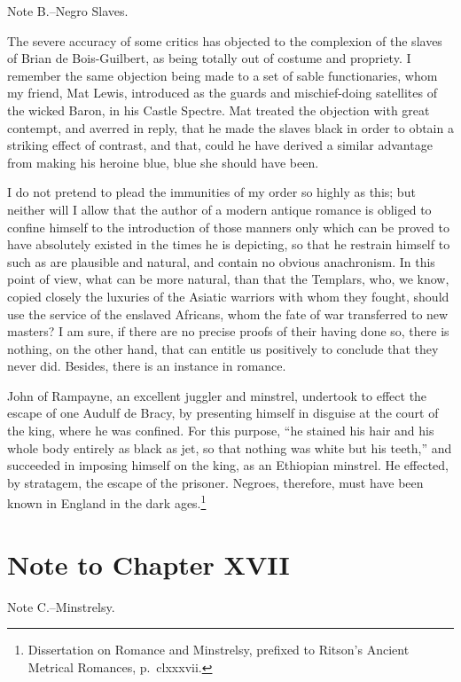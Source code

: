 Note B.--Negro Slaves.

The severe accuracy of some critics has objected to the complexion of
the slaves of Brian de Bois-Guilbert, as being totally out of costume
and propriety. I remember the same objection being made to a set of
sable functionaries, whom my friend, Mat Lewis, introduced as the guards
and mischief-doing satellites of the wicked Baron, in his Castle
Spectre. Mat treated the objection with great contempt, and averred in
reply, that he made the slaves black in order to obtain a striking
effect of contrast, and that, could he have derived a similar advantage
from making his heroine blue, blue she should have been.

I do not pretend to plead the immunities of my order so highly as this;
but neither will I allow that the author of a modern antique romance is
obliged to confine himself to the introduction of those manners only
which can be proved to have absolutely existed in the times he is
depicting, so that he restrain himself to such as are plausible and
natural, and contain no obvious anachronism. In this point of view, what
can be more natural, than that the Templars, who, we know, copied
closely the luxuries of the Asiatic warriors with whom they fought,
should use the service of the enslaved Africans, whom the fate of war
transferred to new masters? I am sure, if there are no precise proofs of
their having done so, there is nothing, on the other hand, that can
entitle us positively to conclude that they never did. Besides, there is
an instance in romance.

John of Rampayne, an excellent juggler and minstrel, undertook to effect
the escape of one Audulf de Bracy, by presenting himself in disguise at
the court of the king, where he was confined. For this purpose, ``he
stained his hair and his whole body entirely as black as jet, so that
nothing was white but his teeth,'' and succeeded in imposing himself on
the king, as an Ethiopian minstrel. He effected, by stratagem, the
escape of the prisoner. Negroes, therefore, must have been known in
England in the dark ages.\footnote{Dissertation on Romance and Minstrelsy,
prefixed to
Ritson's Ancient Metrical Romances, p.~clxxxvii.}

\section*{Note to Chapter XVII}\label{noteCXVII}

Note C.--Minstrelsy.

